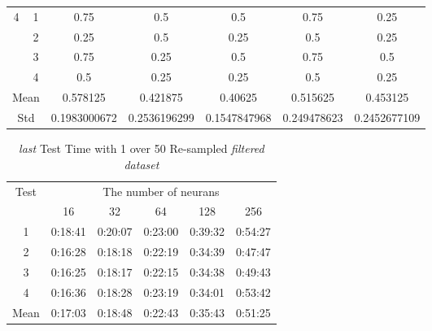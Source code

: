 \documentclass[draft,dvipsnames]{drexel-thesis}
\begin{document}
\begin{thesis}
\begin{table}[!t]
\begin{tabular}{|c|c|c|c|c|c|c|}
\multirow{4}{*}{4}    & 1                   & 0.75         & 0.5          & 0.5          & 0.75        & 0.25         \\ \cline{2-7}
                      & 2                   & 0.25         & 0.5          & 0.25         & 0.5         & 0.25         \\ \cline{2-7}
                      & 3                   & 0.75         & 0.25         & 0.5          & 0.75        & 0.5          \\ \cline{2-7}
                      & 4                   & 0.5          & 0.25         & 0.25         & 0.5         & 0.25         \\ \hline
\multicolumn{2}{|c|}{Mean}                  & 0.578125     & 0.421875     & 0.40625      & 0.515625    & 0.453125     \\ \hline
\multicolumn{2}{|c|}{Std}                   & 0.1983000672 & 0.2536196299 & 0.1547847968 & 0.249478623 & 0.2452677109 \\ \hline
\end{tabular}
\end{table}

\begin{table}[!t]
\centering
\caption{{\em last} Test Time with 1 over 50 Re-sampled {\em filtered dataset}}
\label{tbl:last_1_50_time}
\begin{tabular}{|c|c|c|c|c|c|}
\hline
\multirow{2}{*}{Test}      & \multicolumn{5}{c|}{The number of neurans}                                                                                                               \\ \cline{2-6}
                           & 16                           & 32                           & 64                           & 128                          & 256                          \\ \hline
1                          & 0:18:41                      & 0:20:07                      & 0:23:00                      & 0:39:32                      & 0:54:27                      \\ \hline
2                          & 0:16:28                      & 0:18:18                      & 0:22:19                      & 0:34:39                      & 0:47:47                      \\ \hline
3                          & 0:16:25                      & 0:18:17                      & 0:22:15                      & 0:34:38                      & 0:49:43                      \\ \hline
4                          & 0:16:36                      & 0:18:28                      & 0:23:19                      & 0:34:01                      & 0:53:42                      \\ \hline
\multicolumn{1}{|l|}{Mean} & \multicolumn{1}{l|}{0:17:03} & \multicolumn{1}{l|}{0:18:48} & \multicolumn{1}{l|}{0:22:43} & \multicolumn{1}{l|}{0:35:43} & \multicolumn{1}{l|}{0:51:25} \\ \hline
\end{tabular}
\end{table}


\end{thesis}
\end{document}
